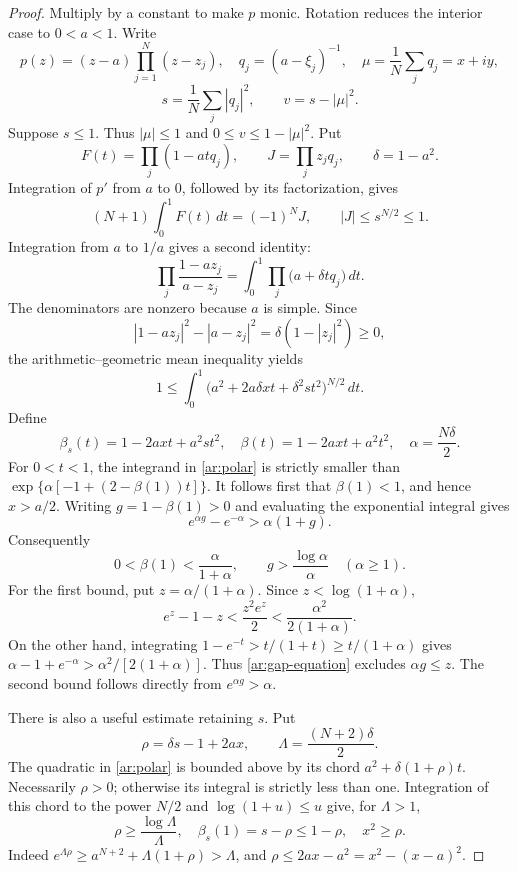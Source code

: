 \begin{proof}
Multiply by a constant to make $p$ monic.
Rotation reduces the interior case to $0<a<1$. Write
\[
 p(z)=(z-a)\prod_{j=1}^N(z-z_j),\quad
 q_j=(a-\xi_j)^{-1},\quad
 \mu=\frac1N\sum_jq_j=x+iy,
\]
\[
 s=\frac1N\sum_j|q_j|^2,\qquad v=s-|\mu|^2.
\]
Suppose $s\le1$. Thus $|\mu|\le1$ and $0\le v\le1-|\mu|^2$.
Put
\[
 F(t)=\prod_j(1-atq_j),\qquad J=\prod_j z_jq_j,
 \qquad \delta=1-a^2.
\]
Integration of $p'$ from $a$ to $0$, followed by its factorization,
gives
\begin{equation}\label{ar:communication-origin}
 (N+1)\int_0^1F(t)\,dt=(-1)^NJ,\qquad |J|\le s^{N/2}\le1.
\end{equation}
Integration from $a$ to $1/a$ gives a second identity:
\begin{equation}\label{ar:communication-polar}
 \prod_j\frac{1-az_j}{a-z_j}
 =\int_0^1\prod_j\bigl(a+\delta t q_j\bigr)\,dt.
\end{equation}
The denominators are nonzero because $a$ is simple. Since
\[
 |1-az_j|^2-|a-z_j|^2=\delta(1-|z_j|^2)\ge0,
\]
the arithmetic--geometric mean inequality yields
\begin{equation}\label{ar:polar}
 1\le\int_0^1\bigl(a^2+2a\delta xt+\delta^2st^2\bigr)^{N/2}\,dt.
\end{equation}
Define
\[
 \beta_s(t)=1-2axt+a^2st^2,\quad
 \beta(t)=1-2axt+a^2t^2,\quad
 \alpha=\frac{N\delta}{2}.
\]
For $0<t<1$, the integrand in \eqref{ar:polar} is strictly smaller than
\(
 \exp\{\alpha[-1+(2-\beta(1))t]\}.
\)
It follows first that $\beta(1)<1$, and hence $x>a/2$.  Writing
$g=1-\beta(1)>0$ and evaluating the exponential integral gives
\begin{equation}\label{ar:gap-equation}
 e^{\alpha g}-e^{-\alpha}>\alpha(1+g).
\end{equation}
Consequently
\begin{equation}\label{ar:polar-gaps}
 0<\beta(1)<\frac{\alpha}{1+\alpha},\qquad
 g>\frac{\log\alpha}{\alpha}\quad(\alpha\ge1).
\end{equation}
For the first bound, put $z=\alpha/(1+\alpha)$. Since
$z<\log(1+\alpha)$,
\[
 e^z-1-z<\frac{z^2e^z}{2}<\frac{\alpha^2}{2(1+\alpha)}.
\]
On the other hand, integrating
$1-e^{-t}>t/(1+t)\ge t/(1+\alpha)$ gives
$\alpha-1+e^{-\alpha}>\alpha^2/[2(1+\alpha)]$.
Thus \eqref{ar:gap-equation} excludes $\alpha g\le z$.
The second bound follows directly from $e^{\alpha g}>\alpha$.

There is also a useful estimate retaining $s$. Put
\[
 \rho=\delta s-1+2ax,\qquad \Lambda=\frac{(N+2)\delta}{2}.
\]
The quadratic in \eqref{ar:polar} is bounded above by its chord
$a^2+\delta(1+\rho)t$.  Necessarily $\rho>0$; otherwise its integral
is strictly less than one. Integration of this chord to the power $N/2$
and $\log(1+u)\le u$ give, for $\Lambda>1$,
\begin{equation}\label{ar:rho}
 \rho\ge\frac{\log\Lambda}{\Lambda},\quad
 \beta_s(1)=s-\rho\le1-\rho,\quad
 x^2\ge\rho.
\end{equation}
Indeed $e^{\Lambda\rho}\ge a^{N+2}+\Lambda(1+\rho)>\Lambda$,
and $\rho\le2ax-a^2=x^2-(x-a)^2$.


\end{proof}
